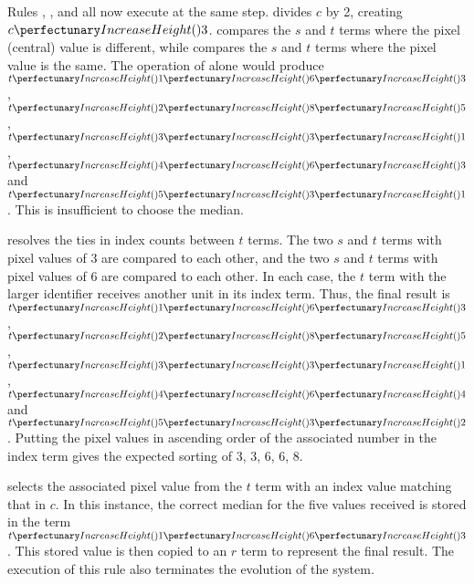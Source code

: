 Rules , , and  all now execute at the same step.   divides \(c\) by 2, creating \(\cpfunc{c}{3}\).   compares the \(s\) and \(t\) terms where the pixel (central) value is different, while  compares the \(s\) and \(t\) terms where the pixel value is the same.  The operation of  alone would produce \(\cpfuncnn{t}{1}{6}{3}\), \(\cpfuncnn{t}{2}{8}{5}\), \(\cpfuncnn{t}{3}{3}{1}\), \(\cpfuncnn{t}{4}{6}{3}\) and \(\cpfuncnn{t}{5}{3}{1}\).  This is insufficient to choose the median.

 resolves the ties in index counts between \(t\) terms.  The two \(s\) and \(t\) terms with pixel values of 3 are compared to each other, and the two \(s\) and \(t\) terms with pixel values of 6 are compared to each other.  In each case, the \(t\) term with the larger identifier receives another unit in its index term.  Thus, the final result is \(\cpfuncnn{t}{1}{6}{3}\), \(\cpfuncnn{t}{2}{8}{5}\), \(\cpfuncnn{t}{3}{3}{1}\), \(\cpfuncnn{t}{4}{6}{4}\) and \(\cpfuncnn{t}{5}{3}{2}\).  Putting the pixel values in ascending order of the associated number in the index term gives the expected sorting of 3, 3, 6, 6, 8.

 selects the associated pixel value from the \(t\) term with an index value matching that in \(c\).  In this instance, the correct median for the five values received is stored in the term \(\cpfuncnn{t}{1}{6}{3}\).  This stored value is then copied to an \(r\) term to represent the final result.  The execution of this rule also terminates the evolution of the system.